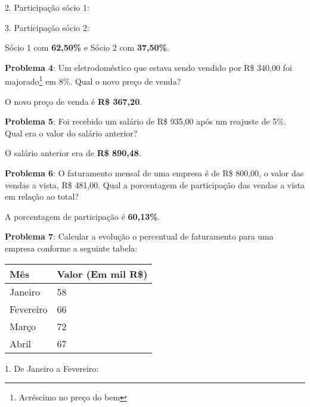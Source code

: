 2. Participação sócio 1:    

3. Participação sócio 2:       

Sócio 1 com \textbf{62,50\%} e Sócio 2 com \textbf{37,50\%}.

\textbf{Problema 4}: Um eletrodoméstico que estava sendo vendido por R\$ 340,00 foi majorado\footnote{Acréscimo no preço do bem} em 8\%. Qual o novo preço de venda?

     \keystroke{$\%$} \keystroke{$+$}

O novo preço de venda é \textbf{R\$ 367,20}.

\textbf{Problema 5}: Foi recebido um salário de R\$ 935,00 após um reajuste de 5\%. Qual era o valor do salário anterior?

       \keystroke{$\%$} \keystroke{$+$} \keystroke{$\div$}

O salário anterior era de \textbf{R\$ 890,48}.

\textbf{Problema 6}: O faturamento mensal de uma empresa é de R\$ 800,00, o valor das vendas a vista, R\$ 481,00. Qual a porcentagem de participação das vendas a vista em relação ao total?

        

A porcentagem de participação é \textbf{60,13\%}.

\textbf{Problema 7}: Calcular a evolução o percentual de faturamento para uma empresa conforme a seguinte tabela:
\begin{table}[H]
	\centering 
	\begin{tabular}{L{2cm} | R{3cm} }
		\textbf{Mês} & \textbf{Valor (Em mil R\$)} \\
		\hline
		Janeiro & 58 \\
		Fevereiro & 66 \\
		Março & 72 \\
		Abril & 67 \\
	\end{tabular}
\end{table}

1. De Janeiro a Fevereiro: \\
     \keystroke{$\bigtriangleup \%$}

